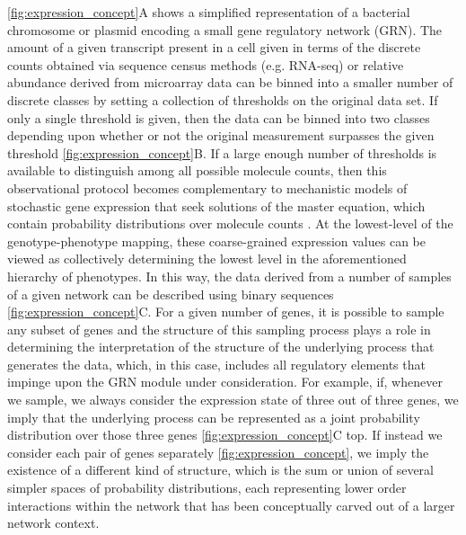 \ref{fig:expression_concept}A shows a simplified representation of a bacterial chromosome or plasmid encoding a small gene regulatory network (GRN). The amount of a given transcript present in a cell given in terms of the discrete counts obtained via sequence census methods (e.g. RNA-seq) or relative abundance derived from microarray data can be binned into a smaller number of discrete classes by setting a collection of thresholds on the original data set. If only a single threshold is given, then the data can be binned into two classes depending upon whether or not the original measurement surpasses the given threshold \ref{fig:expression_concept}B. If a large enough number of thresholds is available to distinguish among all possible molecule counts, then this observational protocol becomes complementary to mechanistic models of stochastic gene expression that seek solutions of the master equation, which contain probability distributions over molecule counts \cite{Walczak2009,Mugler2009}. At the lowest-level of the genotype-phenotype mapping, these coarse-grained expression values can be viewed as collectively determining the lowest level in the aforementioned hierarchy of phenotypes. In this way, the data derived from a number of samples of a given network can be described using binary sequences \ref{fig:expression_concept}C. For a given number of genes, it is possible to sample any subset of genes and the structure of this sampling process plays a role in determining the interpretation of the structure of the underlying process that generates the data, which, in this case, includes all regulatory elements that impinge upon the GRN module under consideration. For example, if, whenever we sample, we always consider the expression state of three out of three genes, we imply that the underlying process can be represented as a joint probability distribution over those three genes \ref{fig:expression_concept}C top. If instead we consider each pair of genes separately \ref{fig:expression_concept}, we imply the existence of a different kind of structure, which is the sum or union of several simpler spaces of probability distributions, each representing lower order interactions within the network that has been conceptually carved out of a larger network context.

